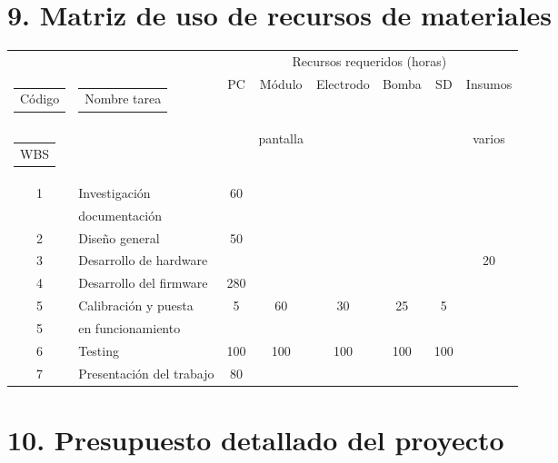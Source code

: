 \documentclass[11pt]{charter}
\begin{document}
\section{9. Matriz de uso de recursos de materiales}
\label{sec:recursos}

\begin{table}[htpb]
\label{tab:recursos}

\begin{tabularx}{\linewidth}{@{}|c|X|c|c|c|c|c|c|@{}}
\hline
\cellcolor[HTML]{C0C0C0} & \cellcolor[HTML]{C0C0C0} & \multicolumn{6}{c|}{\cellcolor[HTML]{C0C0C0}Recursos requeridos (horas)} \\ \cline{3-8} 
\multirow{-2}{*}{\cellcolor[HTML]{C0C0C0}\begin{tabular}[c]{@{}c@{}}Código\end{tabular}} & \multirow{-2}{*}{\cellcolor[HTML]{C0C0C0}\begin{tabular}[c]{@{}c@{}}Nombre tarea\end{tabular}} 
& PC & Módulo  & Electrodo  & Bomba    & SD   & Insumos\\
\multirow{-2}{*}{\cellcolor[HTML]{C0C0C0}\begin{tabular}[c]{@{}c@{}} WBS\end{tabular}} & \multirow{-2}{*}{\cellcolor[HTML]{C0C0C0}\begin{tabular}[c]{@{}c@{}}  \end{tabular}} &  & pantalla  &  &     &  & varios\\ \hline
1& Investigación  &60  &  &  &&  &\\
& documentación   &  &  &  &&  &\\ \hline
2& Diseño general  &50  &  &  &&  &\\ \hline
3& Desarrollo de hardware &  &  &  & & &20\\ \hline
4& Desarrollo del firmware   &280  &  &  & & &\\ \hline
5& Calibración y puesta &5  &60  &30  &25 &5 &\\ 
5& en funcionamiento  &  & &  & & &\\ \hline
6& Testing 	 &100  &100  &100  &100 &100 &\\ \hline
7&Presentación del trabajo   &80  &  &  & & &\\ \hline
\end{tabularx}%
\end{table}


\section{10. Presupuesto detallado del proyecto}
\label{sec:presupuesto}
\end{document}
